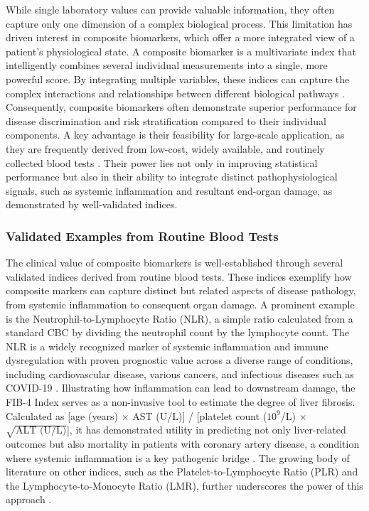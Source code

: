 \documentclass[12pt,a4paper]{article}
\begin{document}
While single laboratory values can provide valuable information, they often capture only one dimension of a complex biological process. This limitation has driven interest in composite biomarkers, which offer a more integrated view of a patient's physiological state. A composite biomarker is a multivariate index that intelligently combines several individual measurements into a single, more powerful score. By integrating multiple variables, these indices can capture the complex interactions and relationships between different biological pathways \cite{ref6}. Consequently, composite biomarkers often demonstrate superior performance for disease discrimination and risk stratification compared to their individual components. A key advantage is their feasibility for large-scale application, as they are frequently derived from low-cost, widely available, and routinely collected blood tests \cite{ref5,ref6}. Their power lies not only in improving statistical performance but also in their ability to integrate distinct pathophysiological signals, such as systemic inflammation and resultant end-organ damage, as demonstrated by well-validated indices.

\subsubsection{Validated Examples from Routine Blood Tests}

The clinical value of composite biomarkers is well-established through several validated indices derived from routine blood tests. These indices exemplify how composite markers can capture distinct but related aspects of disease pathology, from systemic inflammation to consequent organ damage. A prominent example is the Neutrophil-to-Lymphocyte Ratio (NLR), a simple ratio calculated from a standard CBC by dividing the neutrophil count by the lymphocyte count. The NLR is a widely recognized marker of systemic inflammation and immune dysregulation with proven prognostic value across a diverse range of conditions, including cardiovascular disease, various cancers, and infectious diseases such as COVID-19 \cite{ref7,ref8}. Illustrating how inflammation can lead to downstream damage, the FIB-4 Index serves as a non-invasive tool to estimate the degree of liver fibrosis. Calculated as [age (years) $\times$ AST (U/L)] / [platelet count ($10^9$/L) $\times$ $\sqrt{\text{ALT (U/L)}}$], it has demonstrated utility in predicting not only liver-related outcomes but also mortality in patients with coronary artery disease, a condition where systemic inflammation is a key pathogenic bridge \cite{ref7}. The growing body of literature on other indices, such as the Platelet-to-Lymphocyte Ratio (PLR) and the Lymphocyte-to-Monocyte Ratio (LMR), further underscores the power of this approach \cite{ref8}.
\end{document}
